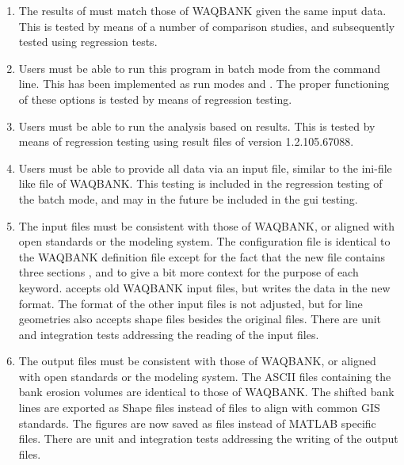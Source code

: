 \begin{enumerate}
\item The results of \dfastbe must match those of WAQBANK given the same input data.
This is tested by means of a number of comparison studies, and subsequently tested using regression tests.

\item Users must be able to run this program in batch mode from the command line.
This has been implemented as run modes  and .
The proper functioning of these options is tested by means of regression testing.

\item Users must be able to run the analysis based on \dflowfm results.
This is tested by means of regression testing using result files of \dflowfm version 1.2.105.67088.

\item Users must be able to provide all data via an input file, similar to the ini-file like file of WAQBANK.
This testing is included in the regression testing of the batch mode, and may in the future be included in the gui testing.

\item The input files must be consistent with those of WAQBANK, or aligned with open standards or the \dflowfm modeling system.
The \dfastbe configuration file is identical to the WAQBANK definition file except for the fact that the new file contains three sections \keyw{[General]}, \keyw{[Detect]} and \keyw{[Erosion]} to give a bit more context for the purpose of each keyword.
\dfastbe accepts old WAQBANK input files, but writes the data in the new format.
The format of the other input files is not adjusted, but for line geometries \dfastbe also accepts shape files besides the original  files.
There are unit and integration tests addressing the reading of the input files.

\item The output files must be consistent with those of WAQBANK, or aligned with open standards or the \dflowfm modeling system.
The ASCII files containing the bank erosion volumes are identical to those of WAQBANK.
The shifted bank lines are exported as Shape files instead of  files to align with common GIS standards.
The figures are now saved as  files instead of MATLAB specific  files.
There are unit and integration tests addressing the writing of the output files.


\end{enumerate}
